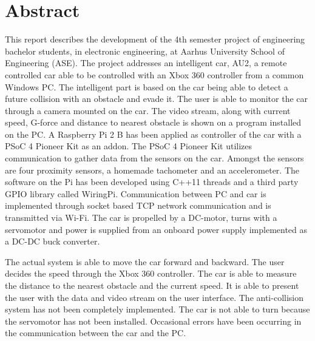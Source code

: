 \chapter{Abstract}
\label{ch:Abstract}

This report describes the development of the 4th semester project of engineering bachelor students, in electronic engineering, at Aarhus University School of Engineering (ASE).
The project addresses an intelligent car, AU2, a remote controlled car able to be controlled with an Xbox 360 controller\cite{lib:xbox-360} from a common Windows PC.
The intelligent part is based on the car being able to detect a future collision with an obstacle and evade it.
The user is able to monitor the car through a camera\cite{lib:cam} mounted on the car.
The video stream, along with current speed, G-force and distance to nearest obstacle is shown on a program installed on the PC.
A Raspberry Pi 2 B\cite{lib:rpi} has been applied as controller of the car with a PSoC 4 Pioneer Kit\cite{lib:psoc4_guide} as an addon. The PSoC 4 Pioneer Kit utilizes \IIC communication to gather data from the sensors on the car. Amongst the sensors are four proximity sensors\cite{lib:maxsonar}, a homemade tachometer and an accelerometer\cite{lib:accel}.
The software on the Pi has been developed using C++11 threads and a third party GPIO library called WiringPi\cite{lib:wiringpi}.
Communication between PC and car is implemented through socket based TCP network communication and is transmitted via Wi-Fi.
The car is propelled by a DC-motor, turns with a servomotor and power is supplied from an onboard power supply implemented as a DC-DC buck converter.

The actual system is able to move the car forward and backward. 
The user decides the speed through the Xbox 360 controller. 
The car is able to measure the distance to the nearest obstacle and the current speed. 
It is able to present the user with the data and video stream on the user interface. 
The anti-collision system has not been completely implemented. 
The car is not able to turn because the servomotor has not been installed. 
Occasional errors have been occurring in the communication between the car and the PC.

\clearpage